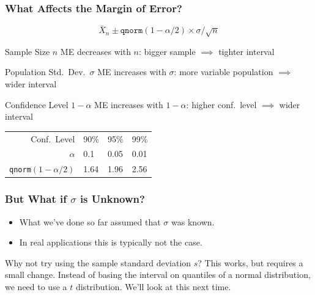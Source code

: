 \documentclass[handout]{beamer}
\begin{document}
\begin{frame}
\frametitle{What Affects the Margin of Error?}

	$$\boxed{\bar{X}_n \pm \texttt{qnorm}(1-\alpha/2) \times \sigma/\sqrt{n}}$$


	
\begin{block}{Sample Size $n$}
ME decreases with $n$: bigger sample $\implies$ tighter interval
\end{block}


\begin{block}{Population Std.\ Dev.\ $\sigma$}
ME increases with $\sigma$: more variable population $\implies$ wider interval
\end{block}



\begin{block}{Confidence Level $1-\alpha$}
ME increases with $1-\alpha$: higher conf.\ level $\implies$ wider interval

\pause

\vspace{1em}
	\begin{tabular}{r|lll}
	\hline
	Conf.\ Level & 90\% & 95\% & 99\% \\
	$\alpha$ & 0.1 & 0.05 & 0.01\\
	\texttt{qnorm}$(1-\alpha/2)$&1.64 & 1.96 & 2.56\\
	\hline
	\end{tabular}
\end{block}	
\end{frame}

\begin{frame}
\frametitle{But What if $\sigma$ is Unknown?}
	\begin{itemize}
		\item What we've done so far assumed that $\sigma$ was known. 
		\item In real applications this is typically not the case. 
	\end{itemize}

\begin{alertblock}{Why not try using the sample standard deviation $s$?}
This works, but requires a small change. Instead of basing the interval on quantiles of a normal distribution, we need to use a $t$ distribution. We'll look at this next time.
\end{alertblock}

\end{frame}
\end{document}
